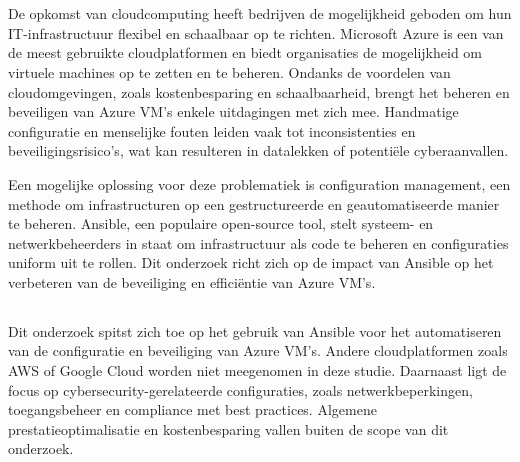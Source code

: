
\chapter{}%
\label{ch:inleiding}

\section{}%
\label{sec:context}

De opkomst van cloudcomputing heeft bedrijven de mogelijkheid geboden om hun IT-infrastructuur flexibel en schaalbaar op te richten.
Microsoft Azure is een van de meest gebruikte cloudplatformen en biedt organisaties de mogelijkheid om virtuele machines op te zetten en te beheren.
Ondanks de voordelen van cloudomgevingen, zoals kostenbesparing en schaalbaarheid, brengt het beheren en beveiligen van Azure VM's enkele uitdagingen met zich mee.
Handmatige configuratie en menselijke fouten leiden vaak tot inconsistenties en beveiligingsrisico's, wat kan resulteren in datalekken of potentiële cyberaanvallen.

Een mogelijke oplossing voor deze problematiek is configuration management, een methode om infrastructuren op een gestructureerde en geautomatiseerde manier te beheren.
Ansible, een populaire open-source tool, stelt systeem- en netwerkbeheerders in staat om infrastructuur als code te beheren en configuraties uniform uit te rollen.
Dit onderzoek richt zich op de impact van Ansible op het verbeteren van de beveiliging en efficiëntie van Azure VM's.

\section{}%
\label{sec:afbakening}

Dit onderzoek spitst zich toe op het gebruik van Ansible voor het automatiseren van de configuratie en beveiliging van Azure VM's.
Andere cloudplatformen zoals AWS of Google Cloud worden niet meegenomen in deze studie.
Daarnaast ligt de focus op cybersecurity-gerelateerde configuraties, zoals netwerkbeperkingen, toegangsbeheer en compliance met best practices.
Algemene prestatieoptimalisatie en kostenbesparing vallen buiten de scope van dit onderzoek.

